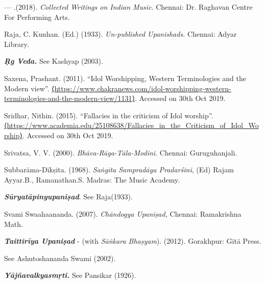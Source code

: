 \begin{thebibliography}{99}
  — .(2018). \textit{Collected Writings on Indian Music}. Chennai: Dr. Raghavan Centre For Performing Arts.

  Raja, C. Kunhan. (Ed.) (1933). \textit{Un-published Upanishads.} Chennai: Adyar Library.

  \textbf{\textit{Ṛg Veda.}} See Kashyap (2003).

  Saxena, Prashant. (2011). “Idol Worshipping, Western Terminologies and the Modern view”. \url{⟨https://www.chakranews.com/idol-worshipping-western-terminologies-and-the-modern-view/1131⟩}. Accessed on 30th Oct 2019.

  Sridhar, Nithin. (2015). “Fallacies in the criticism of Idol worship”. \url{⟨https://www.academia.edu/25108638/Fallacies_in_the_Criticism_of_Idol_Worship⟩}. Accessed on 30th Oct 2019.

  Srivatsa, V. V. (2000). \textit{Bhāva-Rāga-Tāla-Modini}. Chennai: Guruguhanjali.

  Subbarāma-Dīkṣita. (1968). \textit{Saṅgīta Sampradāya Pradarśini}, (Ed) Rajam Ayyar.B., Ramanathan.S. Madras: The Music Academy.

  \textbf{\textit{Sūryatāpinyupaniṣad}}. See Raja(1933).

  Svami Swaahaananda. (2007).\textit{ Chāndogya Upaniṣad,} Chennai: Rama\-krishna Math.

  \textbf{\textit{Taittirīya Upaniṣad}} - (with \textit{Sāṅkara Bhaṣyam}). (2012). Gorakhpur: Gītā Press.

  \hspace{.5cm}See Ashutoshananda Swami (2002).

  \textbf{\textit{Yājñavalkyasmṛti.}} See Pansikar (1926).

 \end{thebibliography}

\theendnotes

